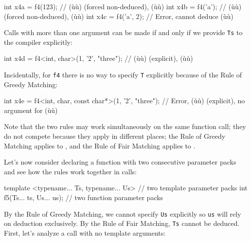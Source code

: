 \begin{emcppslisting}
int x4a = f4(123);     // (ù{}ù) (forced non-deduced), (ù{}ù)
int x4b = f4('a');     // (ù{}ù) (forced non-deduced), (ù{}ù)
int x4c = f4('a', 2);  // Error, cannot deduce (ù{}ù)
\end{emcppslisting}
    

\noindent Calls with more than one argument can be made if and only if we provide
\lstinline!Ts! to the compiler explicitly:

\begin{emcppslisting}
int x4d = f4<int, char>(1, '2', "three");
    // (ù{}ù) (explicit), (ù{}ù)
\end{emcppslisting}
    

\noindent Incidentally, for \lstinline!f4! there is no way to specify \lstinline!T!
explicitly because of the Rule of Greedy Matching:

\begin{emcppslisting}
int x4e = f4<int, char, const char*>(1, '2', "three");
    // Error, (ù{}ù) (explicit), no argument for (ù{}ù)
\end{emcppslisting}
    

\noindent Note that the two rules may work simultaneously on the same function
call; they do not compete because they apply in different places; the
Rule of Greedy Matching applies to ,
and the Rule of Fair Matching applies to .

Let's now consider declaring a function with two consecutive parameter
packs and see how the rules work together in calls:

\begin{emcppslisting}
template <typename... Ts, typename... Us>  // two template parameter packs
int f5(Ts... ts, Us... us);                // two function parameter packs
\end{emcppslisting}
    

\noindent By the Rule of Greedy Matching, we cannot specify \lstinline!Us! explicitly
so \lstinline!us! will rely on deduction exclusively. By the Rule of Fair
Matching, \lstinline!Ts! cannot be deduced. First, let's analyze a call
with no template arguments:


